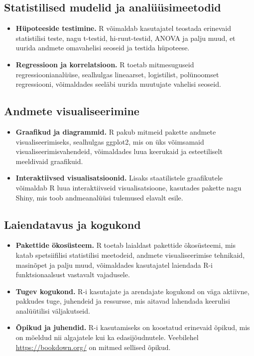 \documentclass[
]{book}
\providecommand{\tightlist}{%
  \setlength{\itemsep}{0pt}\setlength{\parskip}{0pt}}
\begin{document}
\subsection{Statistilised mudelid ja analüüsimeetodid}\label{statistilised-mudelid-ja-analuxfcuxfcsimeetodid}

\begin{itemize}
\tightlist
\item
  \textbf{Hüpoteeside testimine.} R võimaldab kasutajatel teostada erinevaid statistilisi teste, nagu t-testid, hi-ruut-testid, ANOVA ja palju muud, et uurida andmete omavahelisi seoseid ja testida hüpoteese.
\item
  \textbf{Regressioon ja korrelatsioon.} R toetab mitmesuguseid regressioonianalüüse, sealhulgas lineaarset, logistilist, polünoomset regressiooni, võimaldades seeläbi uurida muutujate vahelisi seoseid.
\end{itemize}

\subsection{Andmete visualiseerimine}\label{andmete-visualiseerimine}

\begin{itemize}
\tightlist
\item
  \textbf{Graafikud ja diagrammid.} R pakub mitmeid pakette andmete visualiseerimiseks, sealhulgas ggplot2, mis on üks võimsamaid visualiseerimisvahendeid, võimaldades luua keerukaid ja esteetiliselt meeldivaid graafikuid.
\item
  \textbf{Interaktiivsed visualisatsioonid.} Lisaks staatilistele graafikutele võimaldab R luua interaktiivseid visualisatsioone, kasutades pakette nagu Shiny, mis toob andmeanalüüsi tulemused elavalt esile.
\end{itemize}

\subsection{Laiendatavus ja kogukond}\label{laiendatavus-ja-kogukond}

\begin{itemize}
\tightlist
\item
  \textbf{Pakettide ökosüsteem.} R toetab laialdast pakettide ökosüsteemi, mis katab spetsiifilisi statistilisi meetodeid, andmete visualiseerimise tehnikaid, masinõpet ja palju muud, võimaldades kasutajatel laiendada R-i funktsionaalsust vastavalt vajadusele.
\item
  \textbf{Tugev kogukond.} R-i kasutajate ja arendajate kogukond on väga aktiivne, pakkudes tuge, juhendeid ja ressursse, mis aitavad lahendada keerulisi analüütilisi väljakutseid.
\item
  \textbf{Õpikud ja juhendid.} R-i kasutamiseks on koostatud erinevaid õpikud, mis on mõeldud nii algajatele kui ka edasijõudnutele. Veebilehel \url{https://bookdown.org/} on mitmed sellised õpikud.
\end{itemize}
\end{document}
